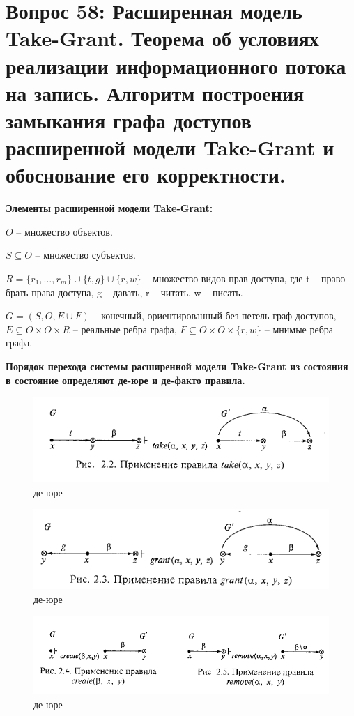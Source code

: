 \section{Вопрос 58: Расширенная модель Take-Grant. Теорема об условиях реализации информационного потока на 
запись. Алгоритм построения замыкания графа доступов расширенной модели Take-Grant и обоснование 
его корректности.}

\textbf{Элементы расширенной модели Take-Grant:}
\begin{enumerate*}
		\item $ O $ -- множество объектов.
		\item $S \subseteq O$ -- множество субъектов.
		\item $ R = \{ r_1, \ldots, r_m \} \cup \{ t, g \} \cup \{r, w\} $ -- множество видов прав доступа, где t -- право брать права доступа, g -- давать, r -- читать, w -- писать.
		\item $ G = (S, O, E \cup F) $ -- конечный, ориентированный без петель граф доступов, $E \subseteq O \times O \times R $ -- реальные ребра графа, $ F \subseteq O \times O \times \{r, w\} $ -- мнимые ребра графа.		
\end{enumerate*}
	
\textbf{Порядок перехода системы расширенной модели Take-Grant из состояния в состояние определяют де-юре и де-факто правила.}

\begin{figure}[H]
	\centering
	\includegraphics[width=0.5\linewidth]{img/8.png}
	\caption{де-юре}
\end{figure}

\begin{figure}[H]
	\centering
	\includegraphics[width=0.5\linewidth]{img/9.png}
	\caption{де-юре}
\end{figure}

\begin{figure}[H]
	\centering
	\includegraphics[width=0.5\linewidth]{img/10.png}
	\caption{де-юре}
\end{figure}


